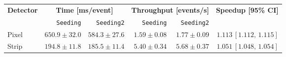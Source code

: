 \renewcommand{\arraystretch}{1.4}
\setlength{\tabcolsep}{5pt}
\footnotesize
\begin{tabular}{lrrrrr}
\toprule
\textbf{Detector} & \multicolumn{2}{c}{\textbf{Time [ms/event]}} & \multicolumn{2}{c}{\textbf{Throughput [events/s]}} & \textbf{Speedup [95\% CI]} \\
\cmidrule(lr){2-3}\cmidrule(lr){4-5}
 & \texttt{Seeding} & \texttt{Seeding2} & \texttt{Seeding} & \texttt{Seeding2} & \\
\midrule
\rowcolor{gray!15}
Pixel & $650.9 \pm 32.0$ & $584.3 \pm 27.6$ & $1.59 \pm 0.08$ & $1.77 \pm 0.09$ & $1.113\,[1.112,\,1.115]$ \\
Strip & $194.8 \pm 11.8$ & $185.5 \pm 11.4$ & $5.40 \pm 0.34$ & $5.68 \pm 0.37$ & $1.051\,[1.048,\,1.054]$ \\
\bottomrule
\end{tabular}
